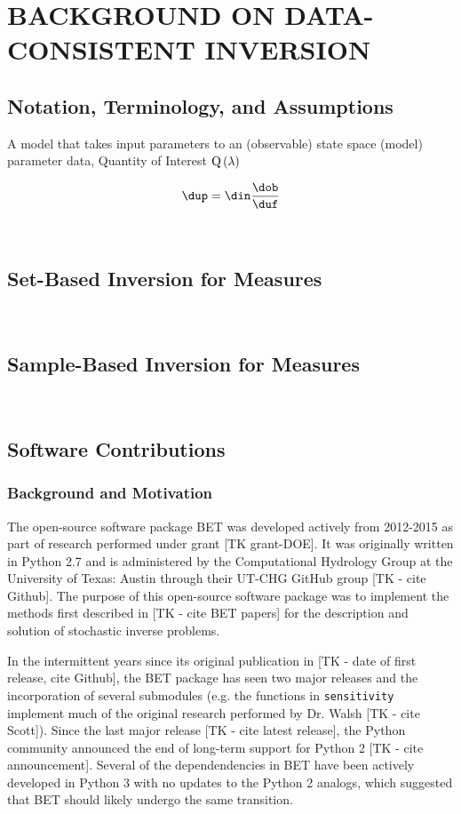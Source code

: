 \chapter{\uppercase{Background on Data-Consistent Inversion} \label{chapter:02}}

\section{Notation, Terminology, and Assumptions}

\begin{itemize}
\itembox{\M} A model that takes input parameters to an (observable) state space
\itembox{\p} (model) parameter
\itembox{\d} data, Quantity of Interest $\operatorname*{Q\left (\operatorname*{\lambda} \right )}$

\end{itemize}

\begin{equation}
\dup = \din \frac{\dob}{\duf}
\end{equation}

\
\section{Set-Based Inversion for Measures}

\
\section{Sample-Based Inversion for Measures \label{sec:ch02:sample}}

\
\section{Software Contributions}

\subsection{Background and Motivation}
The open-source software package BET was developed actively from 2012-2015 as part of research performed under grant [TK grant-DOE].
It was originally written in Python 2.7 and is administered by the Computational Hydrology Group at the University of Texas: Austin through their UT-CHG GitHub group [TK - cite Github]. 
The purpose of this open-source software package was to implement the methods first described in [TK - cite BET papers] for the description and solution of stochastic inverse problems. 

In the intermittent years since its original publication in [TK - date of first release, cite Github], the BET package has seen two major releases and the incorporation of several submodules (e.g. the functions in {\tt sensitivity} implement much of the original research performed by Dr. Walsh [TK - cite Scott]). 
Since the last major release [TK - cite latest release], the Python community announced the end of long-term support for Python 2 [TK - cite announcement]. 
Several of the dependendencies in BET have been actively developed in Python 3 with no updates to the Python 2 analogs, which suggested that BET should likely undergo the same transition.

